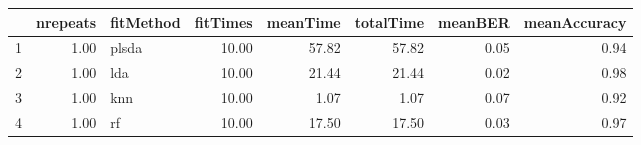 \begin{table}[ht]
\centering
\begin{tabular}{rrlrrrrr}
  \hline
 & nrepeats & fitMethod & fitTimes & meanTime & totalTime & meanBER & meanAccuracy \\ 
  \hline
1 & 1.00 & plsda & 10.00 & 57.82 & 57.82 & 0.05 & 0.94 \\ 
  2 & 1.00 & lda & 10.00 & 21.44 & 21.44 & 0.02 & 0.98 \\ 
  3 & 1.00 & knn & 10.00 & 1.07 & 1.07 & 0.07 & 0.92 \\ 
  4 & 1.00 & rf & 10.00 & 17.50 & 17.50 & 0.03 & 0.97 \\ 
   \hline
\end{tabular}
\end{table}
